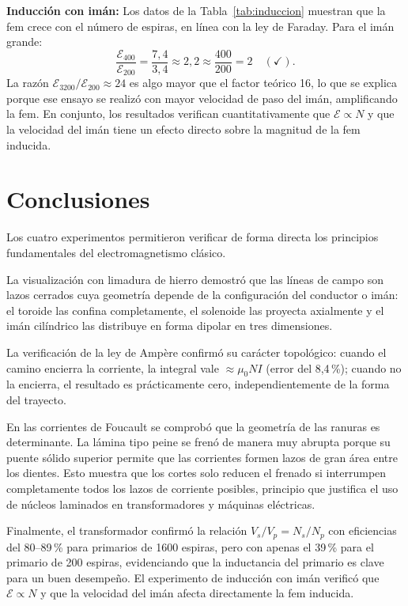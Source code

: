 \documentclass[11pt,twocolumn]{article}
\begin{document}
\textbf{Inducci\'on con im\'an:} Los datos de la Tabla~\ref{tab:induccion} muestran que la fem crece con el n\'umero de espiras, en l\'inea con la ley de Faraday. Para el im\'an grande:
\begin{equation}
  \frac{\mathcal{E}_{400}}{\mathcal{E}_{200}} = \frac{7{,}4}{3{,}4} \approx 2{,}2 \approx \frac{400}{200} = 2 \quad (\checkmark).
\end{equation}
La raz\'on $\mathcal{E}_{3200}/\mathcal{E}_{200}\approx 24$ es algo mayor que el factor te\'orico 16, lo que se explica porque ese ensayo se realiz\'o con mayor velocidad de paso del im\'an, amplificando la fem. En conjunto, los resultados verifican cuantitativamente que $\mathcal{E}\propto N$ y que la velocidad del im\'an tiene un efecto directo sobre la magnitud de la fem inducida.

\section{Conclusiones}

Los cuatro experimentos permitieron verificar de forma directa los principios fundamentales del electromagnetismo cl\'asico.

La visualizaci\'on con limadura de hierro demostr\'o que las l\'ineas de campo son lazos cerrados cuya geometr\'ia depende de la configuraci\'on del conductor o im\'an: el toroide las confina completamente, el solenoide las proyecta axialmente y el im\'an cil\'indrico las distribuye en forma dipolar en tres dimensiones.

La verificaci\'on de la ley de Amp\`ere confirm\'o su car\'acter topol\'ogico: cuando el camino encierra la corriente, la integral vale $\approx\mu_0 NI$ (error del 8,4\,\%); cuando no la encierra, el resultado es pr\'acticamente cero, independientemente de la forma del trayecto.

En las corrientes de Foucault se comprob\'o que la geometr\'ia de las ranuras es determinante. La l\'amina tipo peine se fren\'o de manera muy abrupta porque su puente s\'olido superior permite que las corrientes formen lazos de gran \'area entre los dientes. Esto muestra que los cortes solo reducen el frenado si interrumpen completamente todos los lazos de corriente posibles, principio que justifica el uso de n\'ucleos laminados en transformadores y m\'aquinas el\'ectricas.

Finalmente, el transformador confirm\'o la relaci\'on $V_s/V_p = N_s/N_p$ con eficiencias del 80--89\,\% para primarios de 1600 espiras, pero con apenas el 39\,\% para el primario de 200 espiras, evidenciando que la inductancia del primario es clave para un buen desempe\~no. El experimento de inducci\'on con im\'an verific\'o que $\mathcal{E}\propto N$ y que la velocidad del im\'an afecta directamente la fem inducida.
\end{document}

